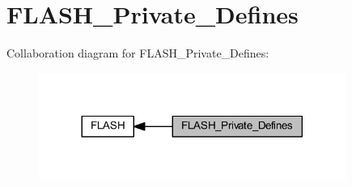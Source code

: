 \hypertarget{group___f_l_a_s_h___private___defines}{}\section{F\+L\+A\+S\+H\+\_\+\+Private\+\_\+\+Defines}
\label{group___f_l_a_s_h___private___defines}
Collaboration diagram for F\+L\+A\+S\+H\+\_\+\+Private\+\_\+\+Defines\+:
\nopagebreak
\begin{figure}[H]
\begin{center}
\leavevmode
\includegraphics[width=284pt]{group___f_l_a_s_h___private___defines}
\end{center}
\end{figure}
